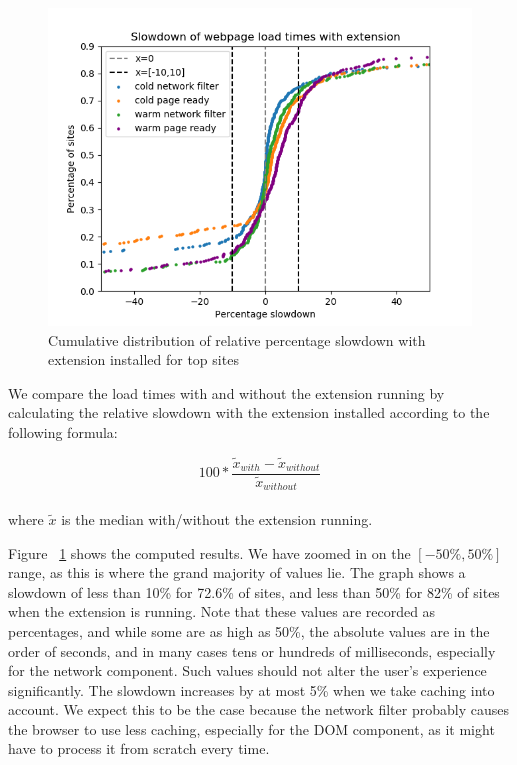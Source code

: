 \begin{figure}[h]
	\includegraphics[scale=0.5]{results/extension_slowdown_overall.png}
	\caption{Cumulative distribution of relative percentage slowdown with extension installed for top sites}
	\label{fig:overall_slowdown}
\end{figure}

We compare the load times with and without the extension running by calculating the relative slowdown with the extension installed according to the following formula: 

\begin{equation*}
100*\frac{\tilde{x}_{with}-\tilde{x}_{without}}{\tilde{x}_{without}}
\end{equation*}
\\
where $\tilde{x}$ is the median with/without the extension running.

Figure ~\ref{fig:overall_slowdown} shows the computed results. We have zoomed in on the $[-50\%,50\%]$ range, as this is where the grand majority of values lie. The graph shows a slowdown of less than 10\% for 72.6\% of sites, and less than 50\% for 82\% of sites when the extension is running. Note that these values are recorded as percentages, and while some are as high as 50\%, the absolute values are in the order of seconds, and in many cases tens or hundreds of milliseconds, especially for the network component. Such values should not alter the user's experience significantly. The slowdown increases by at most 5\% when we take caching into account. We expect this to be the case because the network filter probably causes the browser to use less caching, especially for the DOM component, as it might have to process it from scratch every time.

